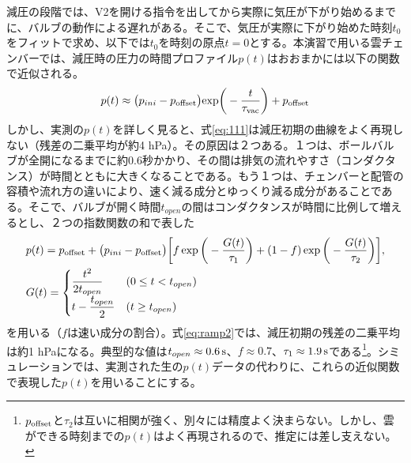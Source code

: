 \documentclass{ltjsarticle}
\begin{document}
減圧の段階では、V2を開ける指令を出してから実際に気圧が下がり始めるまでに、バルブの動作による遅れがある。そこで、気圧が実際に下がり始めた時刻$t_{0}$をフィットで求め、以下では$t_{0}$を時刻の原点$t=0$とする。本演習で用いる雲チェンバーでは、減圧時の圧力の時間プロファイル$p(t)$はおおまかには以下の関数で近似される。
\begin{equation}\label{eq:111}
 p(t)\approx {\big (}p_{ini}-p_{\rm offset}{\big )} {\rm exp}{\bigg (}- \frac{t}{\tau_{\rm vac}} {\bigg )}+ p_{\rm offset}
\end{equation}
しかし、実測の$p(t)$を詳しく見ると、式\eqref{eq:111}は減圧初期の曲線をよく再現しない（残差の二乗平均が約4 hPa）。その原因は２つある。１つは、ボールバルブが全開になるまでに約0.6秒かかり、その間は排気の流れやすさ（コンダクタンス）が時間とともに大きくなることである。もう１つは、チェンバーと配管の容積や流れ方の違いにより、速く減る成分とゆっくり減る成分があることである。そこで、バルブが開く時間$t_{open}$の間はコンダクタンスが時間に比例して増えるとし、２つの指数関数の和で表した
\begin{equation}\label{eq:ramp2}
\begin{split}
&p(t)= p_{\rm offset}+ {\big (}p_{ini}-p_{\rm offset}{\big )}{\bigg [} f\exp{\bigg (}-\frac{G(t)}{\tau_{1}}{\bigg )}+(1-f)\exp{\bigg (}-\frac{G(t)}{\tau_{2}}{\bigg )}{\bigg ]},\\
&G(t)=\begin{cases} \dfrac{t^{2}}{2t_{open}} & (0\le t<t_{open}) \\[2mm] t-\dfrac{t_{open}}{2} & (t\ge t_{open}) \end{cases}
\end{split}
\end{equation}
を用いる（$f$は速い成分の割合）。式\eqref{eq:ramp2}では、減圧初期の残差の二乗平均は約1 hPaになる。典型的な値は$t_{open}\approx0.6\,\rm s$、$f\approx0.7$、$\tau_{1}\approx1.9\,\rm s$である\footnote{$p_{\rm offset}$と$\tau_{2}$は互いに相関が強く、別々には精度よく決まらない。しかし、雲ができる時刻までの$p(t)$はよく再現されるので、推定には差し支えない。}。シミュレーションでは、実測された生の$p(t)$データの代わりに、これらの近似関数で表現した$p(t)$を用いることにする。
\end{document}
